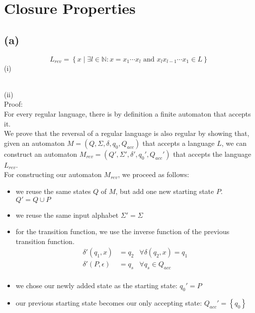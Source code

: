 



\setcounter{section}{2}
\section{Closure Properties}
\subsection{(a)}
$$L_{rev} = \left\{x\mid \exists l \in \mathbb{N}: x = x_{1}\cdots x_{l} \text{ and } x_{l}x_{l-1}\cdots x_{1} \in L\right\}$$
\noindent (i)\\
\\
\noindent (ii)\\
Proof:\\
For every regular language, there is by definition a finite automaton that accepts it.\\
We prove that the reversal of a regular language is also regular by showing that, given an automaton $M=(Q,\Sigma,\delta,q_{0},Q_{acc})$ that accepts a language $L$, we can construct an automaton $M_{rev}=(Q',\Sigma',\delta',q_{0}',Q_{acc}')$ that accepts the language $L_{rev}$.\\
For constructing our automaton $M_{rev}$, we proceed as follows:
\begin{itemize}
    \item we reuse the same states $Q$ of $M$, but add one new starting state $P$.\\
    $Q' = Q \cup {P}$
    \item we reuse the same input alphabet $\Sigma' = \Sigma$
    \item for the transition function, we use the inverse function of the previous transition function.\\
    \begin{align*}
        \delta'(q_{1}, x) &= q_{2}&\forall \delta(q_{2},x) = q_{1}\\
        \delta'(P, \epsilon) &= q_{s} &\forall q_{s}\in Q_{acc}\\
    \end{align*}
    \item we chose our newly added state as the starting state: $q_{0}' = P$
    \item our previous starting state becomes our only accepting state: $Q_{acc}' = \left\{q_{0}\right\}$
\end{itemize}
